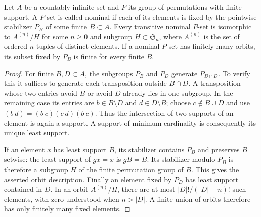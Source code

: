 \begin{lemma}\label{D:nominal-orbits}
Let $A$ be a countably infinite set and $P$ its group of permutations
with finite support. A $P$-set is called nominal if each of its
elements is fixed by the pointwise stabilizer $P_B$ of some finite
$B\subset A$. Every transitive nominal $P$-set is isomorphic to
$A^{(n)}/H$ for some $n\geq0$ and subgroup $H\subset\mathfrak S_n$,
where $A^{(n)}$ is the set of ordered $n$-tuples of distinct elements.
If a nominal $P$-set has finitely many orbits, its subset fixed by
$P_B$ is finite for every finite $B$.
\end{lemma}
\begin{proof}
For finite $B,D\subset A$, the subgroups $P_B$ and $P_D$ generate
$P_{B\cap D}$. To verify this it suffices to generate each transposition
outside $B\cap D$. A transposition whose two entries avoid $B$ or
avoid $D$ already lies in one subgroup. In the remaining case its
entries are $b\in B\setminus D$ and $d\in D\setminus B$; choose
$c\notin B\cup D$ and use
$(b\ d)=(b\ c)(c\ d)(b\ c)$. Thus the intersection of two supports
of an element is again a support. A support of minimum cardinality
is consequently its unique least support.

If an element $x$ has least support $B$, its stabilizer contains $P_B$
and preserves $B$ setwise: the least support of $gx=x$ is $gB=B$.
Its stabilizer modulo $P_B$ is therefore a subgroup $H$ of the finite
permutation group of $B$. This gives the asserted orbit description.
Finally an element fixed by $P_D$ has least support contained in $D$.
In an orbit $A^{(n)}/H$, there are at most $|D|!/(|D|-n)!$ such
elements, with zero understood when $n>|D|$. A finite union of orbits
therefore has only finitely many fixed elements.
\end{proof}

